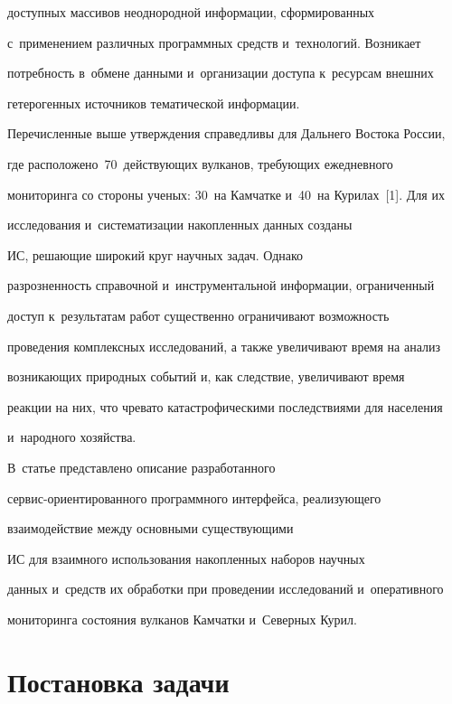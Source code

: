 доступных массивов неоднородной информации, сформированных 


с~применением различных программных средств и~технологий. Возникает 


потребность в~обмене данными и~организации доступа к~ресурсам внешних 


гетерогенных источников тематической информации.





Перечисленные выше утверждения справедливы для Дальнего Востока России, 


где расположено~70~действующих вулканов, требующих ежедневного 


мониторинга со стороны ученых: 30~на Камчатке и~40~на Курилах~[1]. Для их 


исследования и~систематизации накопленных данных созданы 


ИС, решающие широкий круг научных задач. Однако 


разрозненность справочной и~инструментальной информации, ограниченный 


доступ к~результатам работ существенно ограничивают возможность 


проведения комплексных исследований, а также увеличивают время на анализ 


возникающих природных событий и, как следствие, увеличивают время 


реакции на них, что чревато катастрофическими последствиями для населения 


и~народного хозяйства.


     


     В~статье представлено описание разработанного  


сер\-вис-ори\-ен\-ти\-ро\-ван\-но\-го программного интерфейса, реализующего 


взаимодействие между основными существующими 


ИС для взаимного использования накопленных наборов научных 


данных и~средств их обработки при проведении исследований и~оперативного 


мониторинга состояния вулканов Камчатки и~Северных Курил.





\section{Постановка задачи }





